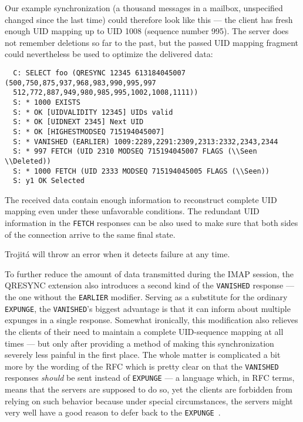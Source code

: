 \documentclass[trojita]{subfiles}
\begin{document}
Our example synchronization (a thousand messages in a mailbox, unspecified changed since the last time) could therefore
look like this --- the client has fresh enough UID mapping up to UID 1008 (sequence number 995).  The server does not
remember deletions so far to the past, but the passed UID mapping fragment could nevertheless be used to optimize the
delivered data:

\begin{verbatim}
  C: SELECT foo (QRESYNC 12345 613184045007 (500,750,875,937,968,983,990,995,997
  512,772,887,949,980,985,995,1002,1008,1111))
  S: * 1000 EXISTS
  S: * OK [UIDVALIDITY 12345] UIDs valid
  S: * OK [UIDNEXT 2345] Next UID
  S: * OK [HIGHESTMODSEQ 715194045007]
  S: * VANISHED (EARLIER) 1009:2289,2291:2309,2313:2332,2343,2344
  S: * 997 FETCH (UID 2310 MODSEQ 715194045007 FLAGS (\\Seen \\Deleted))
  S: * 1000 FETCH (UID 2333 MODSEQ 715194045005 FLAGS (\\Seen))
  S: y1 OK Selected
\end{verbatim}

The received data contain enough information to reconstruct complete UID mapping even under these unfavorable
conditions.  The redundant UID information in the {\tt FETCH} responses can be also used to make sure that both sides of
the connection arrive to the same final state. 

\begin{trojitabehavior}
Trojitá will throw an error when it detects failure at any time.
\end{trojitabehavior}

To further reduce the amount of data transmitted during the IMAP session, the QRESYNC extension also introduces a second
kind of the {\tt VANISHED} response --- the one without the {\tt EARLIER} modifier.  Serving as a substitute for the
ordinary {\tt EXPUNGE}, the {\tt VANISHED}'s biggest advantage is that it can inform about multiple expunges in a single
response.  Somewhat ironically, this modification also relieves the clients of their need to maintain a complete
UID-sequence mapping at all times --- but only after providing a method of making this synchronization severely less
painful in the first place.  The whole matter is complicated a bit more by the wording of the RFC which is pretty clear
on that the {\tt VANISHED} responses {\em should} be sent instead of {\tt EXPUNGE} --- a language which, in RFC terms,
means that the servers are supposed to do so, yet the clients are forbidden from relying on such behavior because under
special circumstances, the servers might very well have a good reason to defer back to the {\tt EXPUNGE}~\cite{rfc2119}.
\end{document}
